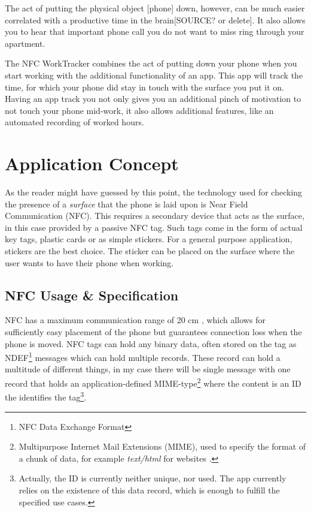 \documentclass[conference]{IEEEtran}
\newcommand{\projectname}{NFC WorkTracker}
\begin{document}
The act of putting the physical object [phone] down, however, can be much easier correlated with a productive time in the brain[SOURCE? or delete]. It also allows you to hear that important phone call you do not want to miss ring through your apartment.

The {\projectname} combines the act of putting down your phone when you start working with the additional functionality of an app. This app will track the time, for which your phone did stay in touch with the surface you put it on. Having an app track you not only gives you an additional pinch of motivation to not touch your phone mid-work, it also allows additional features, like an automated recording of worked hours.

\section{Application Concept}
As the reader might have guessed by this point, the technology used for checking the presence of a \textit{surface} that the phone is laid upon is Near Field Communication (NFC). This requires a secondary device that acts as the surface, in this case provided by a passive NFC tag. Such tags come in the form of actual key tags, plastic cards or as simple stickers. For a general purpose application, stickers are the best choice. The sticker can be placed on the surface where the user wants to have their phone when working.

\subsection{NFC Usage \& Specification}
\label{sec:nfc-details}
NFC has a maximum communication range of 20 cm \cite{nfcsurvey}, which allows for sufficiently easy placement of the phone but guarantees connection loss when the phone is moved. NFC tags can hold any binary data, often stored on the tag as NDEF\footnote{NFC Data Exchange Format} messages which can hold multiple records. These record can hold a multitude of different things, in my case there will be single message with one record that holds an application-defined MIME-type\footnote{Multipurpose Internet Mail Extensions (MIME), used to specify the format of a chunk of data, for example \textit{text/html} for websites \cite{rfc2046}.} \cite{rfc2046} where the content is an ID the identifies the tag\footnote{Actually, the ID is currently neither unique, nor used. The app currently relies on the existence of this data record, which is enough to fulfill the specified use cases.}.
\end{document}

